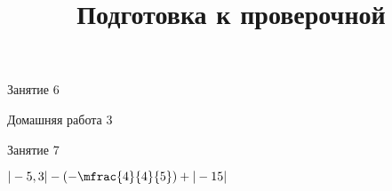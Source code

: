 \begin{class}[number=6]
	\begin{listofex}
		\item Занятие 6
	\end{listofex}
\end{class}

\begin{homework}[number=3]
	\begin{listofex}
		\item Домашняя работа 3
	\end{listofex}
\end{homework}

\begin{class}[number=7]
	\title{Подготовка к проверочной}
	\begin{listofex}
		\item Занятие 7
	\end{listofex}
\end{class}

\begin{exam}
	\begin{listofex}
		\item \( |-5,3| - \left(-\mfrac{4}{4}{5}\right) + |-15| \)
	\end{listofex}
\end{exam}

